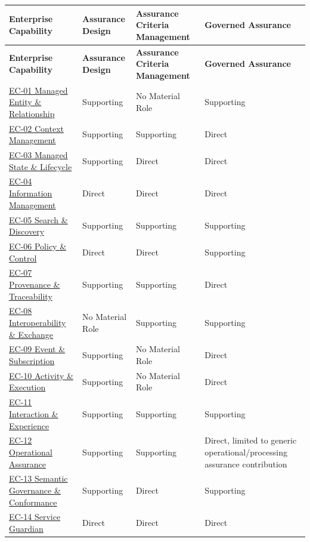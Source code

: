 \begin{longtable}{|>{\raggedright\arraybackslash}p{0.25\TableWidth}|>{\raggedright\arraybackslash}p{0.25\TableWidth}|>{\raggedright\arraybackslash}p{0.25\TableWidth}|>{\raggedright\arraybackslash}p{0.25\TableWidth}|}
\hline\rowcolor{TableHead}\textbf{Enterprise Capability} & \textbf{Assurance Design} & \textbf{Assurance Criteria Management} & \textbf{Governed Assurance}\\\hline\endfirsthead
\hline\rowcolor{TableHead}\textbf{Enterprise Capability} & \textbf{Assurance Design} & \textbf{Assurance Criteria Management} & \textbf{Governed Assurance}\\\hline\endhead
\hline\endfoot
\hyperref[rad:enterprise:103]{EC-01 Managed Entity \& Relationship} & Supporting & No Material Role & Supporting\\\hline
\hyperref[rad:enterprise:112]{EC-02 Context Management} & Supporting & Supporting & Direct\\\hline
\hyperref[rad:enterprise:121]{EC-03 Managed State \& Lifecycle} & Supporting & Direct & Direct\\\hline
\hyperref[rad:enterprise:130]{EC-04 Information Management} & Direct & Direct & Direct\\\hline
\hyperref[rad:enterprise:139]{EC-05 Search \& Discovery} & Supporting & Supporting & Supporting\\\hline
\hyperref[rad:enterprise:148]{EC-06 Policy \& Control} & Direct & Direct & Supporting\\\hline
\hyperref[rad:enterprise:157]{EC-07 Provenance \& Traceability} & Supporting & Supporting & Direct\\\hline
\hyperref[rad:enterprise:166]{EC-08 Interoperability \& Exchange} & No Material Role & Supporting & Supporting\\\hline
\hyperref[rad:enterprise:175]{EC-09 Event \& Subscription} & Supporting & No Material Role & Direct\\\hline
\hyperref[rad:enterprise:184]{EC-10 Activity \& Execution} & Supporting & No Material Role & Direct\\\hline
\hyperref[rad:enterprise:193]{EC-11 Interaction \& Experience} & Supporting & Supporting & Supporting\\\hline
\hyperref[rad:enterprise:202]{EC-12 Operational Assurance} & Supporting & Supporting & Direct, limited to generic operational/\allowbreak{}processing assurance contribution\\\hline
\hyperref[rad:enterprise:215]{EC-13 Semantic Governance \& Conformance} & Supporting & Direct & Supporting\\\hline
\hyperref[rad:enterprise:224]{EC-14 Service Guardian} & Direct & Direct & Direct\\\hline
\end{longtable}\endgroup
{}\label{rad:assurance-strategy:75}

